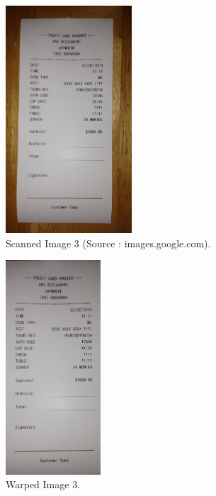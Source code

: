 \pagebreak

\begin{figure}[th]
	\centering
	\includegraphics[height=8.5cm ]{Figures/scanned_image3}
	\caption[Scanned Image 3]{Scanned Image 3 (Source : images.google.com).}
	\label{fig:ScannedImage3}
\end{figure}

\begin{figure}[th]
	\centering
	\includegraphics[height=8cm ]{Figures/warped_image3}
	\caption[Warped Image 3]{Warped Image 3.}
	\label{fig:WarpedImage3}
\end{figure}

\pagebreak

